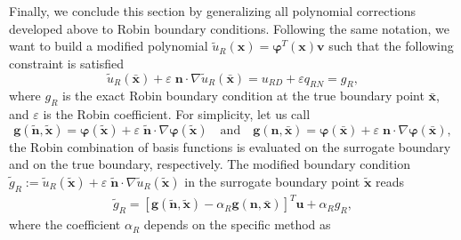 \documentclass{article}
\renewcommand{\phi}{\varphi}
\begin{document}
Finally, we conclude this section by generalizing all polynomial corrections developed above to Robin boundary conditions. Following the same notation, we want to build a modified polynomial $\tilde u_R(\boldsymbol{x})=\boldsymbol{\phi}^T(\boldsymbol{x})\boldsymbol{v}$ such that the following constraint is satisfied
%
\begin{equation}
    \tilde u_R(\bar{\boldsymbol{x}}) + \varepsilon \; \boldsymbol{n}\cdot\nabla \tilde u_R(\bar{\boldsymbol{x}}) = u_{RD} + \varepsilon q_{RN} = g_R,
\end{equation}
%
where $g_R$ is the exact Robin boundary condition at the true boundary point $\bar{\boldsymbol{x}}$, and $\varepsilon$ is the Robin coefficient.
%
For simplicity, let us call 
\begin{equation}
\boldsymbol{g}(\tilde{\boldsymbol{n}},\tilde{\boldsymbol{x}} ) = \boldsymbol{\phi}(\tilde{\boldsymbol{x}}) + \varepsilon \; \tilde{\boldsymbol{n}} \cdot \nabla \boldsymbol{\phi}(\tilde{\boldsymbol{x}}) \quad \text{and} \quad 
\boldsymbol{g}(\boldsymbol{n},\bar{\boldsymbol{x}}) = \boldsymbol{\phi}(\bar{\boldsymbol{x}}) + \varepsilon \;\boldsymbol{n} \cdot \nabla \boldsymbol{\phi}(\bar{\boldsymbol{x}}),
\end{equation}
the Robin combination of basis functions is evaluated on the surrogate boundary and on the true boundary, respectively. The modified boundary condition $\tilde g_R := \tilde u_R(\tilde{\boldsymbol{x}}) + \varepsilon \; \tilde{\boldsymbol{n}} \cdot \nabla \tilde u_R(\tilde{\boldsymbol{x}})$ in the surrogate boundary point $\tilde{\boldsymbol{x}}$ reads
\begin{equation}\label{eq:rodR_final_2D}
    \begin{split}
    \tilde g_R = [\boldsymbol{g}(\tilde{\boldsymbol{n}},\tilde{\boldsymbol{x}}) -\alpha_R \boldsymbol{g}(\boldsymbol{n},\bar{\boldsymbol{x}})]^T \boldsymbol{u} + \alpha_R g_R , 
    \end{split}
\end{equation}
where the coefficient $\alpha_R$ depends on the specific method as
\end{document}
